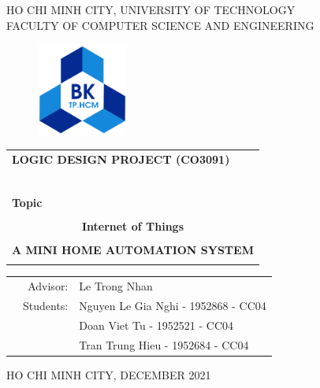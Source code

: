 \documentclass[a4paper]{article}
\begin{document}
\begin{titlepage}
\begin{center}
HO CHI MINH CITY, UNIVERSITY OF TECHNOLOGY \\
FACULTY OF COMPUTER SCIENCE AND ENGINEERING
\end{center}

\vspace{1cm}

\begin{figure}[h!]
\begin{center}
\includegraphics[width=3cm]{pictures/hcmut.png}
\end{center}
\end{figure}

\vspace{1cm}


\begin{center}
\begin{tabular}{c}
\multicolumn{1}{l}{\textbf{{\Large LOGIC DESIGN PROJECT (CO3091)}}}\\
~~\\
\hline
\\
\multicolumn{1}{l}{\textbf{{\Large Topic}}}\\
\\
\textbf{{\Large Internet of Things}}\\
\\
\textbf{{\Large A MINI HOME AUTOMATION SYSTEM}}\\
\\
\hline
\end{tabular}
\end{center}

\vspace{1 cm}

\begin{center}
\begin{table}[h]
\begin{tabular}{rrl}
\hspace{3 cm} & Advisor: & Le Trong Nhan\\
& Students: & Nguyen Le Gia Nghi - 1952868 - CC04\\
& & Doan Viet Tu - 1952521 - CC04\\
& & Tran Trung Hieu - 1952684 - CC04\\
\end{tabular}
\end{table}
\end{center}

\vspace{1 cm}

\begin{center}
{\footnotesize HO CHI MINH CITY, DECEMBER 2021}
\end{center}
\end{titlepage}
\end{document}
